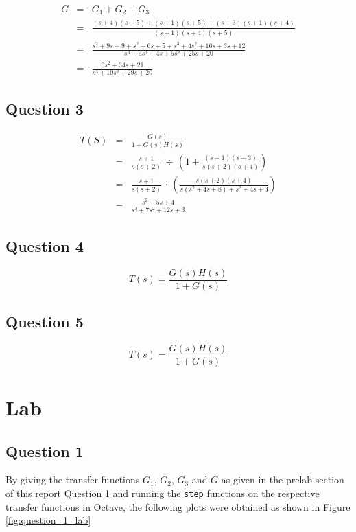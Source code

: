 \documentclass[12pt, a4paper]{article}
\begin{document}
		\begin{equation}
			\begin{array}{rcl}
				G & = & G_1 + G_2 + G_3\\
				  & = & \frac{(s+4)(s+5)+(s+1)(s+5)+(s+3)(s+1)(s+4)}{(s+1)(s+4)(s+5)}\\
				  & = & \frac{s^2+9s+9+s^2+6s+5+s^3+4s^2+16s+3s+12}{s^3+5s^2+4s+5s^2+25s+20}\\
				  & = & \frac{6s^2+34s+21}{s^3+10s^2+29s+20}
			\end{array}
		\end{equation}		

		\subsection{Question 3} %
		\label{sub:question_3}
			\[
				\begin{array}{rcl}
					T(S) & = & \frac{G(s)}{1 + G(s)H(s)} \\
					& = & \frac{s+1}{s(s+2)} \,\div\, \left(1 + \frac{(s+1)(s+3)}{s(s+2)(s+4)} \right) \\
					& = & \frac{s+1}{s(s+2)} \,\cdot\, \left(\frac{s(s+2)(s+4)}{s(s^2 + 4s + 8) + s^2 + 4s + 3} \right) \\
					& = & \frac{s^2 + 5s + 4}{s^3 + 7s^2 + 12s + 3}
				\end{array}
			\]

		\subsection{Question 4} %
		\label{sub:question_4}
			\[
				T(s) = \frac{G(s)H(s)}{1 + G(s)}
			\]

		\subsection{Question 5} %
		\label{sub:question_5}
			\[
				T(s) = \frac{G(s)H(s)}{1 + G(s)}
			\]
		

		\section{Lab} %
		\label{sec:lab}

		\subsection{Question 1} %
		\label{sub:question_1}
		By giving the transfer functions $G_1$, $G_2$, $G_3$ and $G$ as given in the prelab section of this report Question 1 and running the \texttt{step} functions on the respective transfer functions in Octave, the following plots were obtained as shown in Figure \ref{fig:question_1_lab} 
\end{document}
